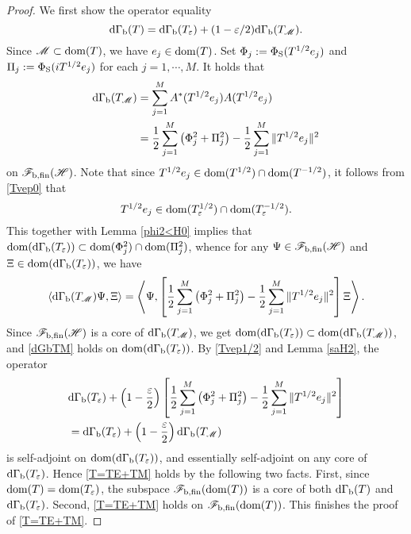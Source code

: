 \documentclass[12pt]{article}
\theoremstyle{plain}
\numberwithin{equation}{section}
\theoremstyle{remark}
\begin{document}
\begin{proof}
We first show the operator equality
\begin{equation}\label{T=TE+TM}
\mathrm{d\Gamma_b}(T)=\mathrm{d\Gamma_b}(T_\varepsilon)+(1-\varepsilon/2)\mathrm{d\Gamma_b}(T_\mathscr{M}).
\end{equation} 
Since $\mathscr{M}\subset\mathop{\mathrm{dom}}(T)$, we have $e_j\in\mathop{\mathrm{dom}}(T)$.
Set $\Phi_j := \Phi_\mathrm{S}(T^{1/2}e_j)$ and $\Pi_j := \Phi_\mathrm{S}(iT^{1/2}e_j)$ for each $j=1,\cdots,M$.
It holds that
\begin{align}\label{dGbTM}
 \mathrm{d\Gamma_b}(T_\mathscr{M}) 
& = \sum_{j=1}^M A^*(T^{1/2}e_j) A(T^{1/2}e_j) \notag\\
& = \frac{1}{2}\sum_{j=1}^M  \left( \Phi_j^2 + \Pi_j^2 \right)
    - \frac{1}{2} \sum_{j=1}^M \| T^{1/2}e_j \|^2 
\end{align}
on $\mathscr{F}_\mathrm{b,fin}(\mathscr{H})$.
Note that since $T^{1/2}e_j\in\mathop{\mathrm{dom}}(T^{1/2})\cap\mathop{\mathrm{dom}}(T^{-1/2})$, 
it follows from \eqref{Tvep0} that 
\begin{equation}\label{Tvep1/2}
T^{1/2}e_j\in\mathop{\mathrm{dom}}(T_\varepsilon^{1/2})\cap\mathop{\mathrm{dom}}(T_\varepsilon^{-1/2}).
\end{equation}
This together with Lemma \ref{phi2<H0} implies that $\mathop{\mathrm{dom}}(\mathrm{d\Gamma_b}(T_\varepsilon))\subset\mathop{\mathrm{dom}}(\Phi_j^2)\cap\mathop{\mathrm{dom}}(\Pi_j^2)$, 
whence for any $\Psi\in\mathscr{F}_\mathrm{b,fin}(\mathscr{H})$ and $\Xi\in\mathop{\mathrm{dom}}(\mathrm{d\Gamma_b}(T_\varepsilon))$, we have
\begin{equation*}
\left\langle\mathrm{d\Gamma_b}(T_\mathscr{M})\Psi,\Xi \right\rangle 
= \left\langle\Psi,\left[\frac{1}{2}\sum_{j=1}^M  \left( \Phi_j^2 + \Pi_j^2 \right)
    - \frac{1}{2} \sum_{j=1}^M \| T^{1/2}e_j \|^2\right]\Xi \right\rangle.
\end{equation*}
Since $\mathscr{F}_\mathrm{b,fin}(\mathscr{H})$ is a core of $\mathrm{d\Gamma_b}(T_\mathscr{M})$, 
we get $\mathop{\mathrm{dom}}(\mathrm{d\Gamma_b}(T_\varepsilon))\subset\mathop{\mathrm{dom}}(\mathrm{d\Gamma_b}(T_\mathscr{M}))$, and \eqref{dGbTM} holds on $\mathop{\mathrm{dom}}(\mathrm{d\Gamma_b}(T_\varepsilon))$.
By \eqref{Tvep1/2} and Lemma \ref{saH2}, the operator
\begin{align*}
&\mathrm{d\Gamma_b}(T_\varepsilon) + \left(1-\frac{\varepsilon}{2}\right)\left[\frac{1}{2}\sum_{j=1}^M  \left( \Phi_j^2 + \Pi_j^2 \right) - \frac{1}{2} \sum_{j=1}^M \| T^{1/2}e_j \|^2\right]\\
&= \mathrm{d\Gamma_b}(T_\varepsilon) + \left(1-\frac{\varepsilon}{2}\right)\mathrm{d\Gamma_b}(T_\mathscr{M})
\end{align*}
is self-adjoint on $\mathop{\mathrm{dom}}(\mathrm{d\Gamma_b}(T_\varepsilon))$, and essentially self-adjoint on any core of $\mathrm{d\Gamma_b}(T_\varepsilon)$.
Hence \eqref{T=TE+TM} holds by the following two facts.
First, since $\mathop{\mathrm{dom}}(T)=\mathop{\mathrm{dom}}(T_\varepsilon)$, the subspace $\mathscr{F}_\mathrm{b,fin}(\mathop{\mathrm{dom}}(T))$ is a core of both $\mathrm{d\Gamma_b}(T)$ and $\mathrm{d\Gamma_b}(T_\varepsilon)$.
Second, \eqref{T=TE+TM} holds on $\mathscr{F}_\mathrm{b,fin}(\mathop{\mathrm{dom}}(T))$.
This finishes the proof of \eqref{T=TE+TM}.


\end{proof}
\end{document}
